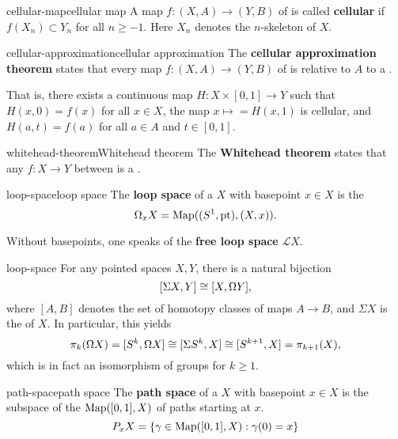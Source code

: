 \begin{topic}{cellular-map}{cellular map}
    A map $f : (X, A) \to (Y, B)$ of  is called \textbf{cellular} if $f(X_n) \subset Y_n$ for all $n \ge -1$. Here $X_n$ denotes the $n$-skeleton of $X$.
\end{topic}

\begin{topic}{cellular-approximation}{cellular approximation}
    The \textbf{cellular approximation theorem} states that every map $f : (X, A) \to (Y, B)$ of  is  relative to $A$ to a .
    
    That is, there exists a continuous map $H : X \times [0, 1] \to Y$ such that $H(x, 0) = f(x)$ for all $x \in X$, the map $x \mapsto = H(x, 1)$ is cellular, and $H(a, t) = f(a)$ for all $a \in A$ and $t \in [0, 1]$.
\end{topic}

\begin{topic}{whitehead-theorem}{Whitehead theorem}
    The \textbf{Whitehead theorem} states that any  $f : X \to Y$ between  is a .
\end{topic}

\begin{topic}{loop-space}{loop space}
    The \textbf{loop space} of a  $X$ with basepoint $x \in X$ is the 
    \[ \Omega_x X = \textup{Map}((S^1, \textup{pt}), (X, x)) . \]
    
    Without basepoints, one speaks of the \textbf{free loop space} $\mathcal{L} X$.
\end{topic}

\begin{example}{loop-space}
    For any pointed spaces $X, Y$, there is a natural bijection
    \[ [\Sigma X, Y] \cong [X, \Omega Y], \]
    where $[A, B]$ denotes the set of homotopy classes of maps $A \to B$, and $\Sigma X$ is the  of $X$.
    In particular, this yields
    \[ \pi_k(\Omega X) = [ S^k, \Omega X ] \cong [ \Sigma S^k, X ] \cong [ S^{k + 1}, X ] = \pi_{k + 1}(X) , \]
    which is in fact an isomorphism of groups for $k \ge 1$.
\end{example}

\begin{topic}{path-space}{path space}
    The \textbf{path space} of a  $X$ with basepoint $x \in X$ is the subspace of the  $\textup{Map}([0, 1], X)$ of paths starting at $x$.
    \[ P_x X = \{ \gamma \in \textup{Map}([0, 1], X) : \gamma(0) = x \} \]
\end{topic}

